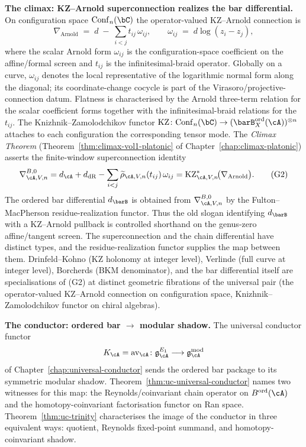 \medskip\noindent\textbf{The climax: KZ--Arnold superconnection realizes the bar differential.}
On configuration space $\mathrm{Conf}_n(\bC)$ the operator-valued
KZ--Arnold connection is
\[
\nabla_{\mathrm{Arnold}}\;=\;d\;-\;\sum_{i<j} t_{ij}\,\omega_{ij},
\qquad
\omega_{ij}\;=\;d\log(z_i-z_j),
\]
where the scalar Arnold form $\omega_{ij}$ is the configuration-space
coefficient on the affine/formal screen and $t_{ij}$ is the
infinitesimal-braid operator. Globally on a curve, \(\omega_{ij}\)
denotes the local representative of the logarithmic normal form along
the diagonal; its coordinate-change cocycle is part of the
Virasoro/projective-connection datum. Flatness is characterised by the
Arnold three-term relation for the scalar coefficient forms together
with the infinitesimal-braid relations for the $t_{ij}$.
The Knizhnik--Zamolodchikov functor
$\mathrm{KZ}\colon \mathrm{Conf}_n(\bC)\to (\barB^{\mathrm{ord}}_X(\cA))^{\otimes n}$
attaches to each configuration the corresponding tensor mode. The
\emph{Climax Theorem} (Theorem~\ref{thm:climax-vol1-platonic} of
Chapter~\ref{chap:climax-platonic}) asserts the finite-window
superconnection identity
\[
\nabla^{B,0}_{\cA,V,n}
=d_\cA+d_{\mathrm{dR}}
-\sum_{i<j}\widetilde\rho_{\cA,V,n}(t_{ij})\,\omega_{ij}
=\mathrm{KZ}_{\cA,V,n}^{\ast}
\!\bigl(\nabla_{\mathrm{Arnold}}\bigr).
\tag{G2}
\]
The ordered bar differential \(d_{\barB}\) is obtained from
\(\nabla^{B,0}_{\cA,V,n}\) by the Fulton--MacPherson
residue-realization functor. Thus the old slogan identifying
\(d_{\barB}\) with a KZ--Arnold pullback is controlled shorthand on
the genus-zero affine/tangent screen. The superconnection and the
chain differential have distinct types, and the residue-realization
functor supplies the map between them.
Drinfeld--Kohno (KZ holonomy at integer level), Verlinde (full curve at
integer level), Borcherds (BKM denominator), and the bar
differential itself are specialisations of (G2) at distinct geometric
fibrations of the universal pair (the operator-valued KZ--Arnold
connection on configuration space, Knizhnik--Zamolodchikov functor on
chiral algebras).

\medskip\noindent\textbf{The conductor: ordered bar $\to$ modular shadow.}
The universal conductor functor
\[
K_\cA=\mathrm{av}_\cA\colon \gAE \longrightarrow \gAmod
\]
of Chapter~\ref{chap:universal-conductor} sends the ordered bar package
to its symmetric modular shadow. Theorem~\ref{thm:uc-universal-conductor}
names two witnesses for this map: the Reynolds/coinvariant chain
operator on $B^{\mathrm{ord}}(\cA)$ and the homotopy-coinvariant
factorisation functor on Ran space. Theorem~\ref{thm:uc-trinity}
characterises the image of the conductor in three equivalent ways:
quotient, Reynolds fixed-point summand, and homotopy-coinvariant
shadow.

